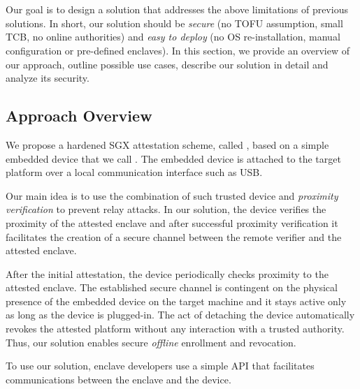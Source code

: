 

\section{\name}
\label{sec:systemDesignMain}

Our goal is to design a solution that addresses the above limitations of previous solutions. In short, our solution should be \emph{secure} (no TOFU assumption, small TCB, no online authorities) and \emph{easy to deploy} (no OS re-installation, manual configuration or pre-defined enclaves). In this section, we provide an overview of our approach, outline possible use cases, describe our solution in detail and analyze its security.

\subsection{Approach Overview}

We propose a hardened SGX attestation scheme, called \name, based on a simple embedded device that we call \device. The embedded device is attached to the target platform over a local communication interface such as USB. 


Our main idea is to use the combination of such trusted device and \emph{proximity verification} to prevent relay attacks. In our solution, the \device device verifies the proximity of the attested enclave and after successful proximity verification it facilitates the creation of a secure channel between the remote verifier and the attested enclave. 

After the initial attestation, the device periodically checks proximity to the attested enclave. The established secure channel is contingent on the physical presence of the embedded device on the target machine and it stays active only as long as the device is plugged-in. The act of detaching the device automatically revokes the attested platform without any interaction with a trusted authority. Thus, our solution enables secure \emph{offline} enrollment and revocation. 

To use our solution, enclave developers use a simple API that facilitates communications between the enclave and the device. 


